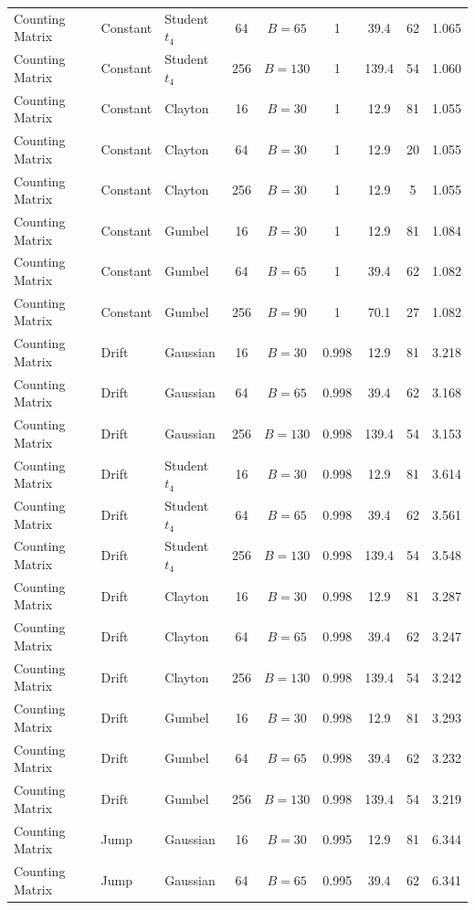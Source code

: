 \begin{longtable}{@{}lllcccccc@{}}
Counting Matrix & Constant & Student $t_4$ & 64 & $B=65$ & 1 & 39.4 & 62 & 1.065 \\
Counting Matrix & Constant & Student $t_4$ & 256 & $B=130$ & 1 & 139.4 & 54 & 1.060 \\
Counting Matrix & Constant & Clayton & 16 & $B=30$ & 1 & 12.9 & 81 & 1.055 \\
Counting Matrix & Constant & Clayton & 64 & $B=30$ & 1 & 12.9 & 20 & 1.055 \\
Counting Matrix & Constant & Clayton & 256 & $B=30$ & 1 & 12.9 & 5 & 1.055 \\
Counting Matrix & Constant & Gumbel & 16 & $B=30$ & 1 & 12.9 & 81 & 1.084 \\
Counting Matrix & Constant & Gumbel & 64 & $B=65$ & 1 & 39.4 & 62 & 1.082 \\
Counting Matrix & Constant & Gumbel & 256 & $B=90$ & 1 & 70.1 & 27 & 1.082 \\
\addlinespace
Counting Matrix & Drift & Gaussian & 16 & $B=30$ & 0.998 & 12.9 & 81 & 3.218 \\
Counting Matrix & Drift & Gaussian & 64 & $B=65$ & 0.998 & 39.4 & 62 & 3.168 \\
Counting Matrix & Drift & Gaussian & 256 & $B=130$ & 0.998 & 139.4 & 54 & 3.153 \\
Counting Matrix & Drift & Student $t_4$ & 16 & $B=30$ & 0.998 & 12.9 & 81 & 3.614 \\
Counting Matrix & Drift & Student $t_4$ & 64 & $B=65$ & 0.998 & 39.4 & 62 & 3.561 \\
Counting Matrix & Drift & Student $t_4$ & 256 & $B=130$ & 0.998 & 139.4 & 54 & 3.548 \\
Counting Matrix & Drift & Clayton & 16 & $B=30$ & 0.998 & 12.9 & 81 & 3.287 \\
Counting Matrix & Drift & Clayton & 64 & $B=65$ & 0.998 & 39.4 & 62 & 3.247 \\
Counting Matrix & Drift & Clayton & 256 & $B=130$ & 0.998 & 139.4 & 54 & 3.242 \\
Counting Matrix & Drift & Gumbel & 16 & $B=30$ & 0.998 & 12.9 & 81 & 3.293 \\
Counting Matrix & Drift & Gumbel & 64 & $B=65$ & 0.998 & 39.4 & 62 & 3.232 \\
Counting Matrix & Drift & Gumbel & 256 & $B=130$ & 0.998 & 139.4 & 54 & 3.219 \\
\addlinespace
Counting Matrix & Jump & Gaussian & 16 & $B=30$ & 0.995 & 12.9 & 81 & 6.344 \\
Counting Matrix & Jump & Gaussian & 64 & $B=65$ & 0.995 & 39.4 & 62 & 6.341 \\

\end{longtable}
